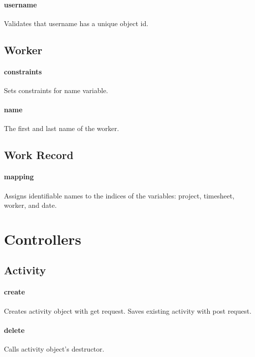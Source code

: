 \documentclass[12pt]{article}
\begin{document}
\paragraph{username} Validates that username has a unique object id.

\setcounter{paragraph}{0}
\subsection{Worker}\label{sec:DWorker}
\paragraph{constraints} Sets constraints for name variable.
\paragraph{name} The first and last name of the worker.

\setcounter{paragraph}{0}
\subsection{Work Record}\label{sec:DWork Record}
\paragraph{mapping} Assigns identifiable names to the indices of the variables: project, timesheet, worker, and date.

\section{Controllers}\label{sec:Controllers}

\subsection{Activity}\label{sec:CActivity}
\paragraph{create} Creates activity object with get request. Saves existing activity with post request.
\paragraph{delete} Calls activity object's destructor.
\end{document}
